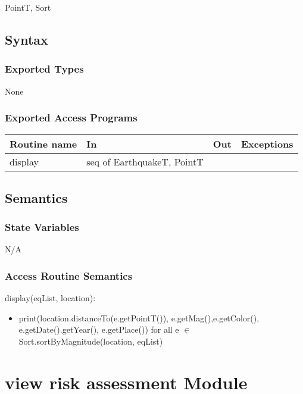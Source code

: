 \documentclass[12pt]{article}
\begin{document}
PointT, Sort

\subsection* {Syntax}

\subsubsection* {Exported Types}

None


\subsubsection* {Exported Access Programs}

\begin{tabular}{| l | l | l | l |}
\hline
\textbf{Routine name} & \textbf{In} & \textbf{Out} & \textbf{Exceptions}\\
\hline
display & seq of EarthquakeT, PointT & ~ &  ~\\
\hline
\end{tabular}

\subsection* {Semantics}

\subsubsection* {State Variables}

N/A


\subsubsection* {Access Routine Semantics}

\noindent display(eqList, location):
\begin{itemize}
\item print(location.distanceTo(e.getPointT()), e.getMag(),e.getColor(), e.getDate().getYear(), e.getPlace()) for all e $\in$ Sort.sortByMagnitude(location, eqList)
\end{itemize}




\newpage

\section* {view risk assessment Module}
\end{document}

